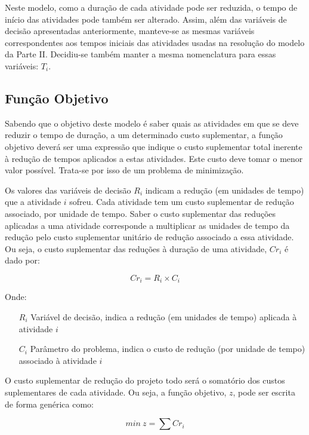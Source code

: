 Neste modelo, como a duração de cada atividade pode ser reduzida, o tempo de início das atividades pode também ser alterado. Assim, além das variáveis de decisão apresentadas anteriormente, manteve-se as mesmas variáveis correspondentes aos tempos iniciais das atividades usadas na resolução do modelo da Parte II.
Decidiu-se também manter a mesma nomenclatura para essas variáveis: $T_{i}$.


\subsection{Função Objetivo}

Sabendo que o objetivo deste modelo é saber quais as atividades em que se deve
reduzir o tempo de duração, a um determinado custo suplementar, a função objetivo deverá ser uma expressão que indique o custo suplementar total inerente à redução de tempos aplicados a estas atividades. Este custo deve tomar o menor valor possível. Trata-se por isso de um problema de minimização. 

Os valores das variáveis de decisão $R_{i}$ indicam a redução (em unidades de tempo) que a atividade $i$ sofreu. Cada atividade tem um custo suplementar de redução associado, por unidade de tempo. Saber o custo suplementar das reduções aplicadas a uma atividade corresponde a multiplicar as unidades de tempo da redução pelo custo suplementar unitário de redução associado a essa atividade. Ou seja, o custo suplementar das reduções à duração de uma atividade, $Cr_{i}$ é dado por:

\begin{displaymath}
Cr_{i} = R_{i} \times C_{i}
\end{displaymath}

Onde:

\begin{itemize}
	\item[$R_{i}$] Variável de decisão, indica a redução (em unidades de tempo) aplicada à atividade $i$
	\item[$C_{i}$] Parâmetro do problema, indica o custo de redução (por unidade de tempo) associado à atividade $i$
\end{itemize}

O custo suplementar de redução do projeto todo será o somatório dos custos suplementares de cada atividade. Ou seja, a função objetivo, $z$, pode ser escrita de forma genérica como:

\begin{displaymath}
 min~z = \sum Cr_{i}
\end{displaymath}

